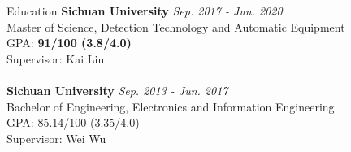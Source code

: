 \documentclass{resume} %
\begin{document}
\begin{rSection}{Education}
	{\bf Sichuan University} \hfill {\em Sep. 2017 - Jun. 2020} 
	\\ Master of Science, Detection Technology and Automatic Equipment\\ GPA: \textbf{91/100 (3.8/4.0)}\\
	Supervisor: Kai Liu\\
	\\{\bf Sichuan University} \hfill {\em Sep. 2013 - Jun. 2017} 
	\\ Bachelor of Engineering, Electronics and Information Engineering\\GPA: 85.14/100 (3.35/4.0)\\
	Supervisor: Wei Wu
\end{rSection}
\end{document}
